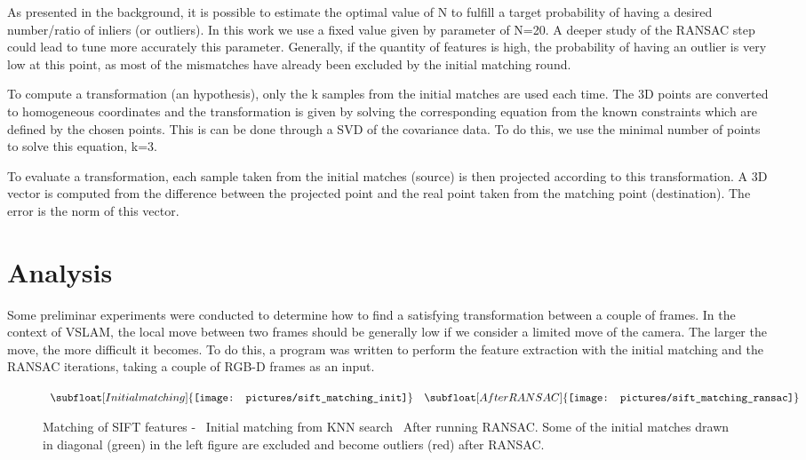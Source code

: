 As presented in the background, it is possible to estimate the optimal value of N to fulfill a target probability of having a desired number/ratio of inliers (or outliers). In this work we use a fixed value given by parameter of N=20. A deeper study of the \gls{RANSAC} step could lead to tune more accurately this parameter. Generally, if the quantity of features is high, the probability of having an outlier is very low at this point, as most of the mismatches have already been excluded by the initial matching round.


To compute a transformation (an hypothesis), only the k samples from the initial matches are used each time. The 3D points are converted to homogeneous coordinates and the transformation is given by solving the corresponding equation from the known constraints which are defined by the chosen points. This is can be done through a \gls{SVD} of the covariance data. To do this, we use the minimal number of points to solve this equation, k=3.

To evaluate a transformation, each sample taken from the initial matches (source) is then projected according to this transformation. A 3D vector is computed from the difference between the projected point and the real point taken from the matching point (destination). The error is the norm of this vector.

\section{Analysis}

Some preliminar experiments were conducted to determine how to find a satisfying transformation between a couple of frames. In the context of \gls{VSLAM}, the local move between two frames should be generally low if we consider a limited move of the camera. The larger the move, the more difficult it becomes. To do this, a program was written to perform the feature extraction with the initial matching and the RANSAC iterations, taking a couple of RGB-D frames as an input.

\begin{figure}[H]
\centering$
 \begin{array}{cc}
 \subfloat[Initial matching]{\label{fig:sift_match_1} \texttt{[image: pictures/sift\_matching\_init]}} &
 \subfloat[After RANSAC]{\label{fig:sift_match_2} \texttt{[image: pictures/sift\_matching\_ransac]}}
 \end{array}$
\caption{Matching of SIFT features - \protect{}~Initial matching from KNN search \protect{}~After running RANSAC. Some of the initial matches drawn in diagonal (green) in the left figure are excluded and become outliers (red) after RANSAC.}
\end{figure}

